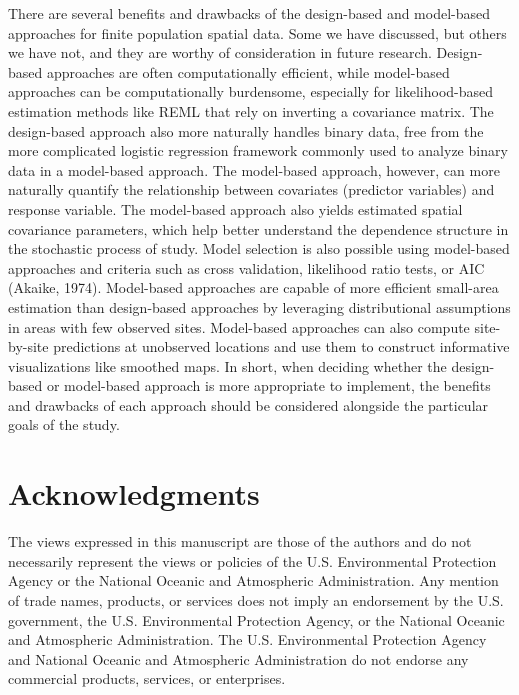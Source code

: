 \documentclass[]{elsarticle} %
\begin{document}
There are several benefits and drawbacks of the design-based and
model-based approaches for finite population spatial data. Some we have
discussed, but others we have not, and they are worthy of consideration
in future research. Design-based approaches are often computationally
efficient, while model-based approaches can be computationally
burdensome, especially for likelihood-based estimation methods like REML
that rely on inverting a covariance matrix. The design-based approach
also more naturally handles binary data, free from the more complicated
logistic regression framework commonly used to analyze binary data in a
model-based approach. The model-based approach, however, can more
naturally quantify the relationship between covariates (predictor
variables) and response variable. The model-based approach also yields
estimated spatial covariance parameters, which help better understand
the dependence structure in the stochastic process of study. Model
selection is also possible using model-based approaches and criteria
such as cross validation, likelihood ratio tests, or AIC (Akaike, 1974).
Model-based approaches are capable of more efficient small-area
estimation than design-based approaches by leveraging distributional
assumptions in areas with few observed sites. Model-based approaches can
also compute site-by-site predictions at unobserved locations and use
them to construct informative visualizations like smoothed maps. In
short, when deciding whether the design-based or model-based approach is
more appropriate to implement, the benefits and drawbacks of each
approach should be considered alongside the particular goals of the
study.

\hypertarget{acknowledgments}{%
\section*{Acknowledgments}\label{acknowledgments}}

The views expressed in this manuscript are those of the authors and do
not necessarily represent the views or policies of the U.S.
Environmental Protection Agency or the National Oceanic and Atmospheric
Administration. Any mention of trade names, products, or services does
not imply an endorsement by the U.S. government, the U.S. Environmental
Protection Agency, or the National Oceanic and Atmospheric
Administration. The U.S. Environmental Protection Agency and National
Oceanic and Atmospheric Administration do not endorse any commercial
products, services, or enterprises.
\end{document}
